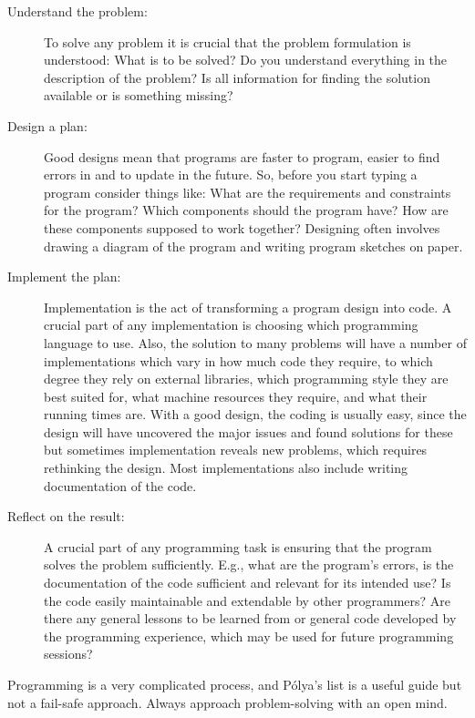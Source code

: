 \begin{description}
\item[Understand the problem:] To solve any problem it is crucial that the problem formulation is understood: What is to be solved? Do you understand everything in the description of the problem? Is all information for finding the solution available or is something missing?
\item[Design a plan:] Good designs mean that programs are faster to program, easier to find errors in and to update in the future. So, before you start typing a program consider things like: What are the requirements and constraints for the program? Which components should the program have? How are these components supposed to work together? Designing often involves drawing a diagram of the program and writing program sketches on paper.
\item[Implement the plan:] Implementation is the act of transforming a program design into code. A crucial part of any implementation is choosing which programming language to use. Also, the solution to many problems will have a number of implementations which vary in how much code they require, to which degree they rely on external libraries, which programming style they are best suited for, what machine resources they require, and what their running times are.  With a good design, the coding is usually easy, since the design will have uncovered the major issues and found solutions for these but sometimes implementation reveals new problems, which requires rethinking the design. Most implementations also include writing documentation of the code.
\item[Reflect on the result:] A crucial part of any programming task is ensuring that the program solves the problem sufficiently. E.g., what are the program's errors, is the documentation of the code sufficient and relevant for its intended use? Is the code easily maintainable and extendable by other programmers? Are there any general lessons to be learned from or general code developed by the programming experience, which may be used for future programming sessions?
\end{description}
Programming is a very complicated process, and Pólya's list is a useful guide but not a fail-safe approach. Always approach problem-solving with an open mind.

